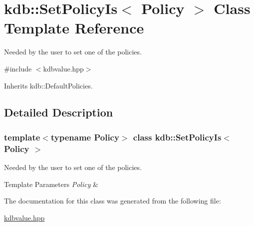 \hypertarget{classkdb_1_1SetPolicyIs}{}\section{kdb\+:\+:Set\+Policy\+Is$<$ Policy $>$ Class Template Reference}
\label{classkdb_1_1SetPolicyIs}


Needed by the user to set one of the policies.  




{\ttfamily \#include $<$kdbvalue.\+hpp$>$}



Inherits kdb\+::\+Default\+Policies.



\subsection{Detailed Description}
\subsubsection*{template$<$typename Policy$>$\newline
class kdb\+::\+Set\+Policy\+Is$<$ Policy $>$}

Needed by the user to set one of the policies. 


\begin{DoxyTemplParams}{Template Parameters}
{\em Policy} & \\
\hline
\end{DoxyTemplParams}


The documentation for this class was generated from the following file\+:\begin{DoxyCompactItemize}
\item 
\hyperlink{kdbvalue_8hpp}{kdbvalue.\+hpp}\end{DoxyCompactItemize}
